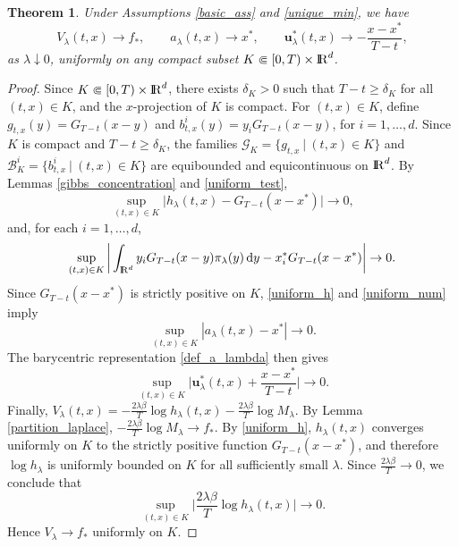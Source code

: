 \documentclass[11pt]{amsart}
\def\R{\mathrm{I\kern-0.21emR}}
\newcommand{\dd}{\,\mathrm{d}}
\renewcommand{\geq}{\geqslant}
\renewcommand{\Vert}{|}
\numberwithin{equation}{section}
\numberwithin{figure}{section}
\newtheorem{theorem}{Theorem}[section]
\theoremstyle{definition}\newtheorem{remark}[theorem]{Remark}%
\begin{document}
\begin{theorem}\label{small_lambda}
Under Assumptions \ref{basic_ass} and \ref{unique_min}, we have
$$
V_\lambda(t,x) \to f_*,
\qquad
a_\lambda(t,x) \to x^*,
\qquad
\mathbf u_\lambda^*(t,x) \to - \frac{x - x^*}{T-t},
$$
as $\lambda \downarrow 0$, uniformly on any compact subset $K \Subset [0,T) \times \R^d$.
\end{theorem}
\begin{proof}
Since $K \Subset [0,T) \times \R^d$, there exists $\delta_K > 0$ such that $T-t \geq \delta_K$ for all $(t,x) \in K$, and the $x$-projection of $K$ is compact. For $(t,x) \in K$, define
$g_{t,x}(y) = G_{T-t}(x-y)$ and $b_{t,x}^i(y) = y_i G_{T-t}(x-y)$, for $i = 1,\dots,d$.
Since $K$ is compact and $T-t \geq \delta_K$, the families
$\mathscr G_K = \big\{ g_{t,x} \ \big\vert\ (t,x) \in K \big\}$
and
$\mathscr B_K^i = \big\{ b_{t,x}^i \ \big\vert\ (t,x) \in K \big\}$
are equibounded and equicontinuous on $\R^d$. By Lemmas \ref{gibbs_concentration} and \ref{uniform_test},
\begin{equation}\label{uniform_h}
\sup_{(t,x) \in K} \vert h_\lambda(t,x) - G_{T-t}(x-x^*) \vert \to 0,
\end{equation}
and, for each $i = 1,\dots,d$,
\begin{equation}\label{uniform_num}
\sup_{(t,x) \in K} \bigg\vert \int_{\R^d} y_i G_{T-t}(x-y)\pi_\lambda(y)\dd y - x_i^* G_{T-t}(x-x^*) \bigg\vert \to 0.
\end{equation}
Since $G_{T-t}(x-x^*)$ is strictly positive on $K$, \eqref{uniform_h} and \eqref{uniform_num} imply
\begin{equation}\label{eq:alambda-limit}
\sup_{(t,x) \in K} \Vert a_\lambda(t,x) - x^* \Vert \to 0.
\end{equation}
The barycentric representation \eqref{def_a_lambda} then gives
$$
\sup_{(t,x) \in K} \bigg\Vert \mathbf u_\lambda^*(t,x) + \frac{x - x^*}{T-t} \bigg\Vert \to 0.
$$
Finally,
$\displaystyle V_\lambda(t,x) = - \frac{2\lambda\beta}{T}\log h_\lambda(t,x) - \frac{2\lambda\beta}{T}\log M_\lambda$.
By Lemma \ref{partition_laplace}, $\displaystyle - \frac{2\lambda\beta}{T}\log M_\lambda \to f_*$.
By \eqref{uniform_h}, $h_\lambda(t,x)$ converges uniformly on $K$ to the strictly positive function $G_{T-t}(x-x^*)$, and therefore $\log h_\lambda$ is uniformly bounded on $K$ for all sufficiently small $\lambda$. Since $\displaystyle \frac{2\lambda\beta}{T} \to 0$, we conclude that
$$
\sup_{(t,x) \in K} \bigg\vert \frac{2\lambda\beta}{T}\log h_\lambda(t,x) \bigg\vert \to 0.
$$
Hence $V_\lambda \to f_*$ uniformly on $K$.
\end{proof}
\end{document}
